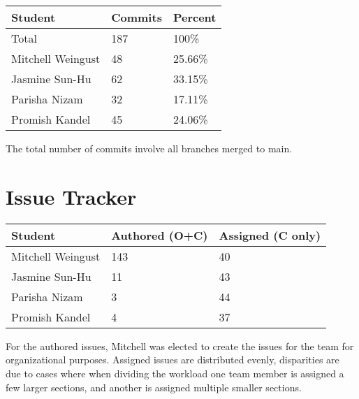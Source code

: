 \documentclass{article}
\begin{document}
\begin{table}[H]
\centering
\begin{tabular}{lll}
\toprule
\textbf{Student} & \textbf{Commits} & \textbf{Percent}\\
\midrule
Total & 187 & 100\% \\
Mitchell Weingust & 48 & 25.66\% \\
Jasmine Sun-Hu & 62 & 33.15\%\\
Parisha Nizam & 32 & 17.11\% \\
Promish Kandel & 45 & 24.06\% \\
\bottomrule
\end{tabular}
\end{table}

The total number of commits involve all branches merged to main.

\section{Issue Tracker}

\begin{table}[H]
\centering
\begin{tabular}{lll}
\toprule
\textbf{Student} & \textbf{Authored (O+C)} & \textbf{Assigned (C only)}\\
\midrule
Mitchell Weingust & 143 & 40 \\
Jasmine Sun-Hu & 11 & 43 \\
Parisha Nizam & 3 & 44 \\
Promish Kandel & 4 & 37 \\
\bottomrule
\end{tabular}
\end{table}

For the authored issues, Mitchell was elected to create the issues for the team for organizational purposes. Assigned issues are distributed evenly, disparities are due to 
cases where when dividing the workload one team member is assigned a few larger sections, and another is assigned multiple smaller sections.
\end{document}
